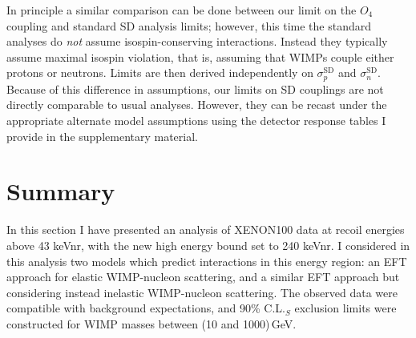 In principle a similar comparison can be done between our limit on the $O_4$ coupling and standard SD analysis limits; however, this time the standard analyses do {\em not} assume isospin-conserving interactions. Instead they typically assume maximal isospin violation, that is, assuming that WIMPs couple either protons or neutrons. Limits are then derived independently on $\sigma_{p}^\mathrm{SD}$ and $\sigma_{n}^\mathrm{SD}$. Because of this difference in assumptions, our limits on SD couplings are not directly comparable to usual analyses. However, they can be recast under the appropriate alternate model assumptions using the detector response tables I provide in the supplementary material.

\section{Summary}
In this section I have presented an analysis of XENON100 data at
recoil energies above 43 keVnr, with the new high energy
bound set to 240 keVnr. I considered in this analysis two
models which predict interactions in this energy region:
an EFT approach for elastic WIMP-nucleon scattering,
and a similar EFT approach but considering instead inelastic WIMP-nucleon scattering. The observed data were
compatible with background expectations, and 90\% C.L.$_S$
exclusion limits were constructed for WIMP masses between (10 and 1000)\,GeV.
%

